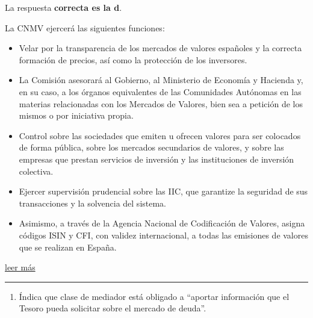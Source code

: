 \documentclass[
  letterpaper,
  DIV=11,
  numbers=noendperiod]{scrreprt}
\providecommand{\tightlist}{%
  \setlength{\itemsep}{0pt}\setlength{\parskip}{0pt}}\usepackage{longtable,booktabs,array}
\begin{document}
\begin{tcolorbox}[enhanced jigsaw, left=2mm, opacityback=0, colback=white, breakable, arc=.35mm, bottomrule=.15mm, rightrule=.15mm, toprule=.15mm, leftrule=.75mm, colframe=quarto-callout-tip-color-frame]
\begin{minipage}[t]{5.5mm}
\textcolor{quarto-callout-tip-color}{\faLightbulb}
\end{minipage}%
\begin{minipage}[t]{\textwidth - 5.5mm}

La respuesta \textbf{correcta es la d}.

La CNMV ejercerá las siguientes funciones:

\begin{itemize}
\item
  Velar por la transparencia de los mercados de valores españoles y la
  correcta formación de precios, así como la protección de los
  inversores.
\item
  La Comisión asesorará al Gobierno, al Ministerio de Economía y
  Hacienda y, en su caso, a los órganos equivalentes de las Comunidades
  Autónomas en las materias relacionadas con los Mercados de Valores,
  bien sea a petición de los mismos o por iniciativa propia.
\item
  Control sobre las sociedades que emiten u ofrecen valores para ser
  colocados de forma pública, sobre los mercados secundarios de valores,
  y sobre las empresas que prestan servicios de inversión y las
  instituciones de inversión colectiva.
\item
  Ejercer supervisión prudencial sobre las IIC, que garantize la
  seguridad de sus transacciones y la solvencia del sistema.
\item
  Asimismo, a través de la Agencia Nacional de Codificación de Valores,
  asigna códigos ISIN y CFI, con validez internacional, a todas las
  emisiones de valores que se realizan en España.
\end{itemize}

\href{http://www.cnmv.es/docportal/Legislacion/resoluciones/REGLAMENTO_R_INT_2016.pdf}{leer
más}

\end{minipage}%
\end{tcolorbox}

\begin{center}\rule{0.5\linewidth}{0.5pt}\end{center}

\begin{enumerate}
\def\labelenumi{\arabic{enumi}.}
\setcounter{enumi}{13}
\tightlist
\item
  Índica que clase de mediador está obligado a ``aportar información que
  el Tesoro pueda solicitar sobre el mercado de deuda''.
\end{enumerate}
\end{document}
